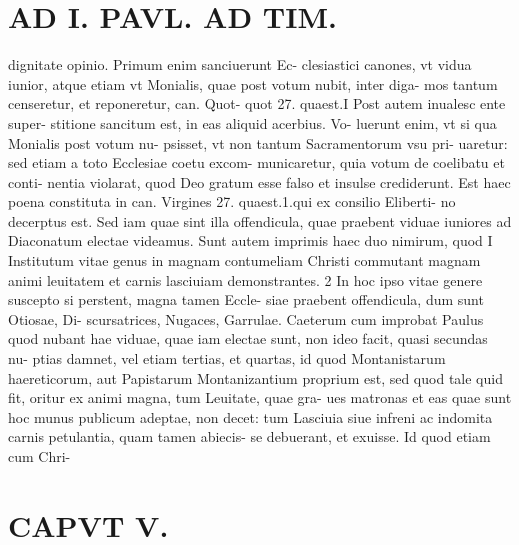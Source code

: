 \documentclass{article}
\begin{document}
\begin{pages}
\section*{AD I. PAVL. AD TIM. }
\marginpar{[ p.262 ]}\pstart dignitate opinio. Primum enim sanciuerunt Ec- clesiastici canones, vt vidua iunior, atque etiam vt Monialis, quae post votum nubit, inter diga- mos tantum censeretur, et reponeretur, can. Quot- quot 27. quaest.I Post autem inualesc ente super- stitione sancitum est, in eas aliquid acerbius. Vo- luerunt enim, vt si qua Monialis post votum nu- psisset, vt non tantum Sacramentorum vsu pri- uaretur: sed etiam a toto Ecclesiae coetu excom- municaretur, quia votum de coelibatu et conti- nentia violarat, quod Deo gratum esse falso et insulse crediderunt. Est haec poena constituta in can. Virgines 27. quaest.1.qui ex consilio Eliberti- no decerptus est. Sed iam quae sint illa offendicula, quae praebent viduae iuniores ad Diaconatum electae videamus. Sunt autem imprimis haec duo nimirum, quod I Institutum vitae genus in magnam contumeliam Christi commutant magnam animi leuitatem et carnis lasciuiam demonstrantes. 2 In hoc ipso vitae genere suscepto si perstent, magna tamen Eccle- siae praebent offendicula, dum sunt Otiosae, Di- scursatrices, Nugaces, Garrulae. Caeterum cum improbat Paulus quod nubant hae viduae, quae iam electae sunt, non ideo facit, quasi secundas nu- ptias damnet, vel etiam tertias, et quartas, id quod Montanistarum haereticorum, aut Papistarum Montanizantium proprium est, sed quod tale quid fit, oritur ex animi magna, tum Leuitate, quae gra- ues matronas et eas quae sunt hoc munus publicum adeptae, non decet: tum Lasciuia siue infreni ac indomita carnis petulantia, quam tamen abiecis- se debuerant, et exuisse. Id quod etiam cum Chri-  \pend
\section*{CAPVT V. }
\marginpar{[ p.283 ]}\pstart {}
{}

\end{pages}
\end{document}
